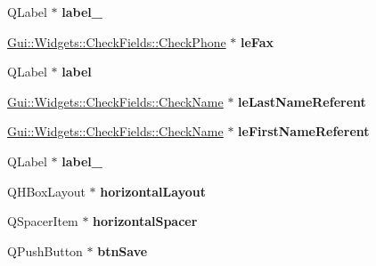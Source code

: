 \begin{DoxyCompactItemize}
\item 
\hypertarget{classUi__DialogAddCustomer_a0aeb5e39cdc300ea2863696b8a903038}{Q\-Label $\ast$ {\bfseries label\-\_}}\label{classUi__DialogAddCustomer_a0aeb5e39cdc300ea2863696b8a903038}

\item 
\hypertarget{classUi__DialogAddCustomer_a5570907361e7bbb8f0463d029ca6b4c3}{\hyperlink{classGui_1_1Widgets_1_1CheckFields_1_1CheckPhone}{Gui\-::\-Widgets\-::\-Check\-Fields\-::\-Check\-Phone} $\ast$ {\bfseries le\-Fax}}\label{classUi__DialogAddCustomer_a5570907361e7bbb8f0463d029ca6b4c3}

\item 
\hypertarget{classUi__DialogAddCustomer_abf62d41f68f71f957f1af5959083d264}{Q\-Label $\ast$ {\bfseries label}}\label{classUi__DialogAddCustomer_abf62d41f68f71f957f1af5959083d264}

\item 
\hypertarget{classUi__DialogAddCustomer_a041353d28461b6eb5cdccd5775abc0df}{\hyperlink{classGui_1_1Widgets_1_1CheckFields_1_1CheckName}{Gui\-::\-Widgets\-::\-Check\-Fields\-::\-Check\-Name} $\ast$ {\bfseries le\-Last\-Name\-Referent}}\label{classUi__DialogAddCustomer_a041353d28461b6eb5cdccd5775abc0df}

\item 
\hypertarget{classUi__DialogAddCustomer_a072ec24e89268f73fc9c00faf8f20676}{\hyperlink{classGui_1_1Widgets_1_1CheckFields_1_1CheckName}{Gui\-::\-Widgets\-::\-Check\-Fields\-::\-Check\-Name} $\ast$ {\bfseries le\-First\-Name\-Referent}}\label{classUi__DialogAddCustomer_a072ec24e89268f73fc9c00faf8f20676}

\item 
\hypertarget{classUi__DialogAddCustomer_a88fd85d22be216d2b4a31cab0e358809}{Q\-Label $\ast$ {\bfseries label\-\_}}\label{classUi__DialogAddCustomer_a88fd85d22be216d2b4a31cab0e358809}

\item 
\hypertarget{classUi__DialogAddCustomer_adcd160170269a007eb143a60bde16a6e}{Q\-H\-Box\-Layout $\ast$ {\bfseries horizontal\-Layout}}\label{classUi__DialogAddCustomer_adcd160170269a007eb143a60bde16a6e}

\item 
\hypertarget{classUi__DialogAddCustomer_ace8f096f97ae1c060676aa27cb966fcb}{Q\-Spacer\-Item $\ast$ {\bfseries horizontal\-Spacer}}\label{classUi__DialogAddCustomer_ace8f096f97ae1c060676aa27cb966fcb}

\item 
\hypertarget{classUi__DialogAddCustomer_af167825ef708dcf7156bc8d83f208643}{Q\-Push\-Button $\ast$ {\bfseries btn\-Save}}\label{classUi__DialogAddCustomer_af167825ef708dcf7156bc8d83f208643}


\end{DoxyCompactItemize}

